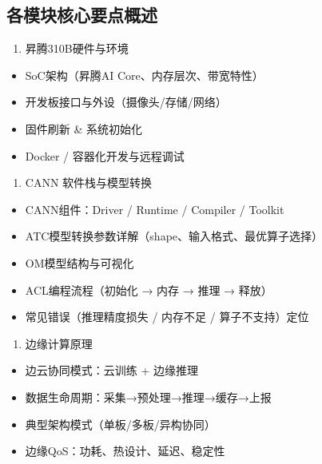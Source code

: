 \subsection*{各模块核心要点概述}\label{各模块核心要点概述}

\begin{enumerate}
\def\labelenumi{\arabic{enumi}.}
\tightlist
\item
  昇腾310B硬件与环境
\end{enumerate}

\begin{itemize}
\tightlist
\item
  SoC架构（昇腾AI Core、内存层次、带宽特性）
\item
  开发板接口与外设（摄像头/存储/网络）
\item
  固件刷新 \& 系统初始化
\item
  Docker / 容器化开发与远程调试
\end{itemize}

\begin{enumerate}
\def\labelenumi{\arabic{enumi}.}
\setcounter{enumi}{1}
\tightlist
\item
  CANN 软件栈与模型转换
\end{enumerate}

\begin{itemize}
\tightlist
\item
  CANN组件：Driver / Runtime / Compiler / Toolkit
\item
  ATC模型转换参数详解（shape、输入格式、最优算子选择）
\item
  OM模型结构与可视化
\item
  ACL编程流程（初始化 → 内存 → 推理 → 释放）
\item
  常见错误（推理精度损失 / 内存不足 / 算子不支持）定位
\end{itemize}

\begin{enumerate}
\def\labelenumi{\arabic{enumi}.}
\setcounter{enumi}{2}
\tightlist
\item
  边缘计算原理
\end{enumerate}

\begin{itemize}
\tightlist
\item
  边云协同模式：云训练 + 边缘推理
\item
  数据生命周期：采集→预处理→推理→缓存→上报
\item
  典型架构模式（单板/多板/异构协同）
\item
  边缘QoS：功耗、热设计、延迟、稳定性
\end{itemize}

